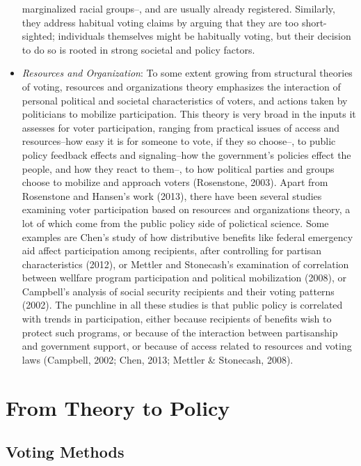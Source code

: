 \documentclass[12pt,twoside]{reedthesis}
\begin{document}
\begin{itemize}
    marginalized racial groups--, and are usually already registered.
    Similarly, they address habitual voting claims by arguing that they
    are too short-sighted; individuals themselves might be habitually
    voting, but their decision to do so is rooted in strong societal and
    policy factors.
  \item
    \emph{Resources and Organization}: To some extent growing from
    structural theories of voting, resources and organizations theory
    emphasizes the interaction of personal political and societal
    characteristics of voters, and actions taken by politicians to
    mobilize participation. This theory is very broad in the inputs it
    assesses for voter participation, ranging from practical issues of
    access and resources--how easy it is for someone to vote, if they so
    choose--, to public policy feedback effects and signaling--how the
    government's policies effect the people, and how they react to them--,
    to how political parties and groups choose to mobilize and approach
    voters (Rosenstone, 2003). Apart from Rosenstone and Hansen's work
    (2013), there have been several studies examining voter participation
    based on resources and organizations theory, a lot of which come from
    the public policy side of polictical science. Some examples are Chen's
    study of how distributive benefits like federal emergency aid affect
    participation among recipients, after controlling for partisan
    characteristics (2012), or Mettler and Stonecash's examination of
    correlation between wellfare program participation and political
    mobilization (2008), or Campbell's analysis of social security
    recipients and their voting patterns (2002). The punchline in all
    these studies is that public policy is correlated with trends in
    participation, either because recipients of benefits wish to protect
    such programs, or because of the interaction between partisanship and
    government support, or because of access related to resources and
    voting laws (Campbell, 2002; Chen, 2013; Mettler \& Stonecash, 2008).
  \end{itemize}
  
  \section{From Theory to Policy}\label{from-theory-to-policy}
  
  \subsection{Voting Methods}\label{voting-methods}
  
\end{document}
